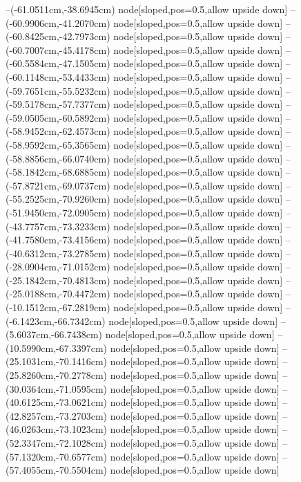 --(-61.0511cm,-38.6945cm) node[sloped,pos=0.5,allow upside down]{\ArrowIn}
--(-60.9906cm,-41.2070cm) node[sloped,pos=0.5,allow upside down]{\ArrowIn}
--(-60.8425cm,-42.7973cm) node[sloped,pos=0.5,allow upside down]{\ArrowIn}
--(-60.7007cm,-45.4178cm) node[sloped,pos=0.5,allow upside down]{\ArrowIn}
--(-60.5584cm,-47.1505cm) node[sloped,pos=0.5,allow upside down]{\ArrowIn}
--(-60.1148cm,-53.4433cm) node[sloped,pos=0.5,allow upside down]{\ArrowIn}
--(-59.7651cm,-55.5232cm) node[sloped,pos=0.5,allow upside down]{\ArrowIn}
--(-59.5178cm,-57.7377cm) node[sloped,pos=0.5,allow upside down]{\ArrowIn}
--(-59.0505cm,-60.5892cm) node[sloped,pos=0.5,allow upside down]{\ArrowIn}
--(-58.9452cm,-62.4573cm) node[sloped,pos=0.5,allow upside down]{\ArrowIn}
--(-58.9592cm,-65.3565cm) node[sloped,pos=0.5,allow upside down]{\ArrowIn}
--(-58.8856cm,-66.0740cm) node[sloped,pos=0.5,allow upside down]{\arrowIn}
--(-58.1842cm,-68.6885cm) node[sloped,pos=0.5,allow upside down]{\ArrowIn}
--(-57.8721cm,-69.0737cm) node[sloped,pos=0.5,allow upside down]{\arrowIn}
--(-55.2525cm,-70.9260cm) node[sloped,pos=0.5,allow upside down]{\ArrowIn}
--(-51.9450cm,-72.0905cm) node[sloped,pos=0.5,allow upside down]{\ArrowIn}
--(-43.7757cm,-73.3233cm) node[sloped,pos=0.5,allow upside down]{\ArrowIn}
--(-41.7580cm,-73.4156cm) node[sloped,pos=0.5,allow upside down]{\ArrowIn}
--(-40.6312cm,-73.2785cm) node[sloped,pos=0.5,allow upside down]{\ArrowIn}
--(-28.0904cm,-71.0152cm) node[sloped,pos=0.5,allow upside down]{\ArrowIn}
--(-25.1842cm,-70.4813cm) node[sloped,pos=0.5,allow upside down]{\ArrowIn}
--(-25.0188cm,-70.4472cm) node[sloped,pos=0.5,allow upside down]{\arrowIn}
--(-10.1512cm,-67.2819cm) node[sloped,pos=0.5,allow upside down]{\ArrowIn}
--(-6.1423cm,-66.7342cm) node[sloped,pos=0.5,allow upside down]{\ArrowIn}
--(5.6037cm,-66.7438cm) node[sloped,pos=0.5,allow upside down]{\ArrowIn}
--(10.5990cm,-67.3397cm) node[sloped,pos=0.5,allow upside down]{\ArrowIn}
--(25.1031cm,-70.1416cm) node[sloped,pos=0.5,allow upside down]{\ArrowIn}
--(25.8260cm,-70.2778cm) node[sloped,pos=0.5,allow upside down]{\arrowIn}
--(30.0364cm,-71.0595cm) node[sloped,pos=0.5,allow upside down]{\ArrowIn}
--(40.6125cm,-73.0621cm) node[sloped,pos=0.5,allow upside down]{\ArrowIn}
--(42.8257cm,-73.2703cm) node[sloped,pos=0.5,allow upside down]{\ArrowIn}
--(46.0263cm,-73.1023cm) node[sloped,pos=0.5,allow upside down]{\ArrowIn}
--(52.3347cm,-72.1028cm) node[sloped,pos=0.5,allow upside down]{\ArrowIn}
--(57.1320cm,-70.6577cm) node[sloped,pos=0.5,allow upside down]{\ArrowIn}
--(57.4055cm,-70.5504cm) node[sloped,pos=0.5,allow upside down]{\arrowIn}
